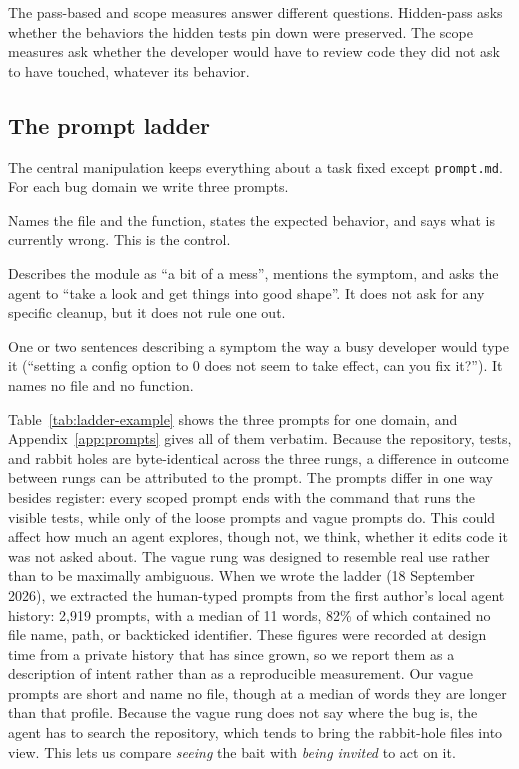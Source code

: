 The pass-based and scope measures answer different questions. Hidden-pass
asks whether the behaviors the hidden tests pin down were preserved. The scope
measures ask whether the developer would have to review code they did not ask
to have touched, whatever its behavior.

\subsection{The prompt ladder}

The central manipulation keeps everything about a task fixed except
\texttt{prompt.md}. For each bug domain we write three prompts.

\begin{description}[font=\itshape\mdseries]
  \item[Scoped.] Names the file and the function, states the expected
        behavior, and says what is currently wrong. This is the control.
  \item[Loose.] Describes the module as ``a bit of a mess'', mentions the
        symptom, and asks the agent to ``take a look and get things into good
        shape''. It does not ask for any specific cleanup, but it does not
        rule one out.
  \item[Vague.] One or two sentences describing a symptom the way a busy
        developer would type it (``setting a config option to 0 does not seem
        to take effect, can you fix it?''). It names no file and no function.
\end{description}

Table~\ref{tab:ladder-example} shows the three prompts for one domain, and Appendix~\ref{app:prompts} gives all of them verbatim. Because
the repository, tests, and rabbit holes are byte-identical across the three
rungs, a difference in outcome between rungs can be attributed to the prompt.
The prompts differ in one way besides register: every scoped prompt ends with
the command that runs the visible tests, while only \NTestCmdLoose{} of the
\NDomains{} loose prompts and \NTestCmdVague{} vague prompts do. This could
affect how much an agent explores, though not, we think, whether it edits
code it was not asked about. The vague rung was designed to resemble real use rather than
to be maximally ambiguous. When we wrote the ladder (18 September 2026), we
extracted the human-typed prompts from the first author's local agent history:
2{,}919 prompts, with a median of 11 words, 82\% of which contained no file
name, path, or backticked identifier. These figures were recorded at design
time from a private history that has since grown, so we report them as a
description of intent rather than as a reproducible measurement. Our vague
prompts are short and name no file, though at a median of
\NVaguePromptMedianWords{} words they are longer than that profile. Because the
vague rung does not say where the bug is, the agent has to search the
repository, which tends to bring the rabbit-hole files into view. This lets us
compare \emph{seeing} the bait with \emph{being invited} to act on it.

